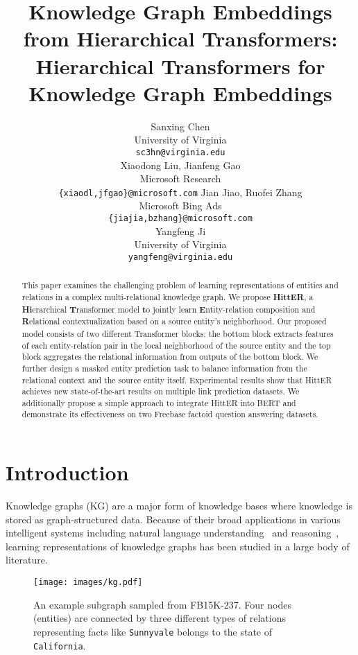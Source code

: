 \documentclass[11pt]{article}
\title{Knowledge Graph Embeddings from Hierarchical Transformers}
\title{\hit: Hierarchical Transformers for Knowledge Graph Embeddings}
\author{
 Sanxing Chen\Thanks{Work was done during an internship at Microsoft Bing Ads.} \\
 University of Virginia \\
 {\tt sc3hn@virginia.edu} \\ \And
 Xiaodong Liu, Jianfeng Gao \\
 Microsoft Research \\
 {\tt \{xiaodl,jfgao\}@microsoft.com}
 \AND
 Jian Jiao, Ruofei Zhang \\
 Microsoft Bing Ads \\
 {\tt \{jiajia,bzhang\}@microsoft.com} \\ \And
 Yangfeng Ji \\
 University of Virginia \\
 {\tt yangfeng@virginia.edu}
}
\date{}
\newcommand{\hit}{HittER\xspace}
\begin{document}
\maketitle
\begin{abstract}
This paper examines the challenging problem of learning representations of entities and relations in a complex multi-relational knowledge graph.
We propose \textbf{\hit}, a \textbf{Hi}erarchical \textbf{T}ransformer model \textbf{t}o jointly learn \textbf{E}ntity-relation composition and \textbf{R}elational contextualization based on a source entity's neighborhood.
Our proposed model consists of two different Transformer blocks: the bottom block extracts features of each entity-relation pair in the local neighborhood of the source entity and the top block aggregates the relational information from outputs of the bottom block.
We further design a masked entity prediction task to balance information from the relational context and the source entity itself.
Experimental results show that \hit{} achieves new state-of-the-art results on multiple link prediction datasets.
We additionally propose a simple approach to integrate \hit{} into BERT and demonstrate its effectiveness on two Freebase factoid question answering datasets.
\end{abstract}

\section{Introduction}

Knowledge graphs (KG) are a major form of knowledge bases where knowledge is stored as graph-structured data. Because of their broad applications in various intelligent systems including natural language understanding~\cite{logan-etal-2019-baracks,zhang-etal-2019-ernie,hayashi2020latent} and reasoning~\cite{Riedel-etal-2013-relation,xiong-etal-2017-deeppath,bauer-etal-2018-commonsense,verga-etal-2021-adaptable}, learning representations of knowledge graphs has been studied in a large body of literature.

\begin{figure}[tb]
  \centering
  \texttt{[image: images/kg.pdf]}
  \caption{An example subgraph sampled from FB15K-237. Four nodes (entities) are connected by three different types of relations representing facts like \texttt{Sunnyvale} belongs to the state of \texttt{California}.}
  \label{fig:kg}
\end{figure}
\end{document}
